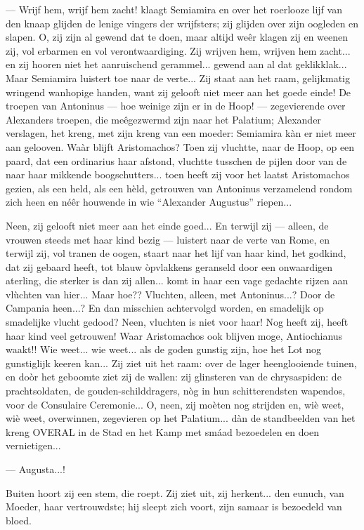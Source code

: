 \documentclass[a4paper, 12pt, oneside, dutch]{article}
\begin{document}
--- Wrijf hem, wrijf hem zacht! klaagt Semiamira en over het roerlooze lijf van den knaap glijden de lenige vingers der wrijfsters; zij glijden over zijn oogleden en slapen. O, zij zijn al gewend dat te doen, maar altijd weêr klagen zij en weenen zij, vol erbarmen en vol verontwaardiging. Zij wrijven hem, wrijven hem zacht... en zij hooren niet het aanruischend gerammel... gewend aan al dat geklikklak... Maar Semiamira luistert toe naar de verte... Zij staat aan het raam, gelijkmatig wringend wanhopige handen, want zij gelooft niet meer aan het goede einde! De troepen van Antoninus --- hoe weinige zijn er in de Hoop! --- zegevierende over Alexanders troepen, die meêgezwermd zijn naar het Palatium; Alexander verslagen, het kreng, met zijn kreng van een moeder: Semiamira kàn er niet meer aan gelooven. Waàr blijft Aristomachos? Toen zij vluchtte, naar de Hoop, op een paard, dat een ordinarius haar afstond, vluchtte tusschen de pijlen door van de naar haar mikkende boogschutters... toen heeft zij voor het laatst Aristomachos gezien, als een held, als een hèld, getrouwen van Antoninus verzamelend rondom zich heen en néêr houwende in wie "`Alexander Augustus"' riepen...

Neen, zij gelooft niet meer aan het einde goed... En terwijl zij --- alleen, de vrouwen steeds met haar kind bezig --- luistert naar de verte van Rome, en terwijl zij, vol tranen de oogen, staart naar het lijf van haar kind, het godkind, dat zij gebaard heeft, tot blauw òpvlakkens geranseld door een onwaardigen aterling, die sterker is dan zij allen... komt in haar een vage gedachte rijzen aan vlùchten van hier... Maar hoe?? Vluchten, alleen, met Antoninus...? Door de Campania heen...? En dan misschien achtervolgd worden, en smadelijk op smadelijke vlucht gedood? Neen, vluchten is niet voor haar! Nog heeft zij, heeft haar kind veel getrouwen! Waar Aristomachos ook blijven moge, Antiochianus waakt!! Wie weet... wie weet... als de goden gunstig zijn, hoe het Lot nog gunstiglijk keeren kan... Zij ziet uit het raam: over de lager heenglooiende tuinen, en doòr het geboomte ziet zij de wallen: zij glinsteren van de chrysaspiden: de prachtsoldaten, de gouden-schilddragers, nòg in hun schitterendsten wapendos, voor de Consulaire Ceremonie... O, neen, zij moèten nog strijden en, wiè weet, wiè weet, overwinnen, zegevieren op het Palatium... dàn de standbeelden van het kreng OVERAL in de Stad en het Kamp met smáad bezoedelen en doen vernietigen...

--- Augusta...!

Buiten hoort zij een stem, die roept. Zij ziet uit, zij herkent... den eunuch, van Moeder, haar vertrouwdste; hij sleept zich voort, zijn samaar is bezoedeld van bloed.
\end{document}
